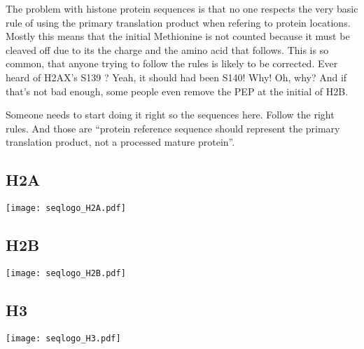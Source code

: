     The problem with histone protein sequences is that no one respects the very
    basic rule of using the primary translation product when refering to protein
    locations. Mostly this means that the initial Methionine is not counted because
    it must be cleaved off due to its the charge and the amino acid that follows.
    This is so common, that anyone trying to follow the rules is likely to be corrected.
    Ever heard of H2AX's S139 ? Yeah, it should had been S140! Why! Oh, why?
    And if that's not bad enough, some people even remove the PEP at the initial
    of H2B.

    Someone needs to start doing it right so the sequences here. Follow the right
    rules. And those are ``protein reference sequence should represent the primary
    translation product, not a processed mature protein''\citep{desc-seq-variant}.

  \subsection{H2A}
    \begin{TableAndFigure*}
      \label{tab:H2A-consensus}
      

      \texttt{[image: seqlogo\_H2A.pdf]}
      \label{fig:H2A-weblogo}
    \end{TableAndFigure*}


  \subsection{H2B}
    \begin{TableAndFigure*}
      \label{tab:H2B-consensus}
      

      \texttt{[image: seqlogo\_H2B.pdf]}
      \label{fig:H2B-weblogo}
    \end{TableAndFigure*}

  \subsection{H3}
    \begin{TableAndFigure*}
      \label{tab:H3-consensus}
      

      \texttt{[image: seqlogo\_H3.pdf]}
      \label{fig:H3-weblogo}
    \end{TableAndFigure*}


